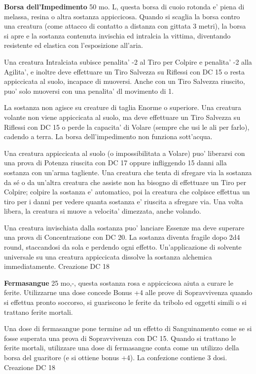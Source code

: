 \documentclass[a4paper,11pt,twoside,openany]{book}
\begin{document}
{\textbf{Borsa dell'Impedimento} 50 mo. L, questa borsa di cuoio rotonda e' piena di melassa, resina o altra sostanza appiccicosa. Quando si scaglia la borsa contro una creatura (come attacco di contatto a distanza con gittata 3 metri), la borsa si apre e la sostanza contenuta invischia ed intralcia la vittima, diventando resistente ed elastica con l'esposizione all'aria.

Una creatura Intralciata subisce penalita' -2 al Tiro per Colpire e penalita' -2 alla Agilita', e inoltre deve effettuare un Tiro Salvezza su Riflessi con DC 15 o resta appiccicata al suolo, incapace di muoversi. Anche con un Tiro Salvezza riuscito, puo' solo muoversi con una penalita' dl movimento di 1.

La sostanza non agisce su creature di taglia Enorme o superiore. Una creatura volante non viene appiccicata al suolo, ma deve effettuare un Tiro Salvezza su Riflessi con DC 15 o perde la capacita' di Volare (sempre che usi le ali per farlo), cadendo a terra. La borsa dell'impedimento non funziona sott'acqua.

Una creatura appiccicata al suolo (o impossibilitata a Volare) puo' liberarsi con una prova di Potenza riuscita con DC 17 oppure infliggendo 15 danni alla sostanza con un'arma tagliente. Una creatura che tenta di sfregare via la sostanza da sé o da un'altra creatura che assiste non ha bisogno di effettuare un Tiro per Colpire; colpire la sostanza e' automatico, poi la creatura che colpisce effettua un tiro per i danni per vedere quanta sostanza e' riuscita a sfregare via. Una volta libera, la creatura si muove a velocita' dimezzata, anche volando.

Una creatura invischiata dalla sostanza puo' lanciare Essenze ma deve superare una prova di Concentrazione con DC 20. La sostanza diventa fragile dopo 2d4 round, staccandosi da sola e perdendo ogni effetto. Un'applicazione di solvente universale su una creatura appiccicata dissolve la sostanza alchemica immediatamente. Creazione DC 18

\textbf{Fermasangue} 25 mo,-, questa sostanza rosa e appiccicosa aiuta a curare le ferite. Utilizzarne una dose concede Bonus +4 alle prove di Sopravvivenza quando si effettua pronto soccorso, si guariscono le ferite da tribolo ed oggetti simili o si trattano ferite mortali. 

Una dose di fermasangue pone termine ad un effetto di Sanguinamento come se si fosse superata una prova di Sopravvivenza con DC 15. Quando si trattano le ferite mortali, utilizzare una dose di fermasangue conta come un utilizzo della borsa del guaritore (e si ottiene bonus +4). La confezione contiene 3 dosi. Creazione DC 18

}
\end{document}

